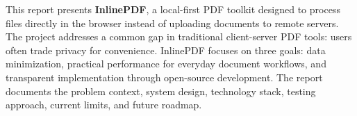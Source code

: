 This report presents \textbf{InlinePDF}, a local-first PDF toolkit designed to process files directly in the browser instead of uploading documents to remote servers. The project addresses a common gap in traditional client-server PDF tools: users often trade privacy for convenience. InlinePDF focuses on three goals: data minimization, practical performance for everyday document workflows, and transparent implementation through open-source development. The report documents the problem context, system design, technology stack, testing approach, current limits, and future roadmap.
